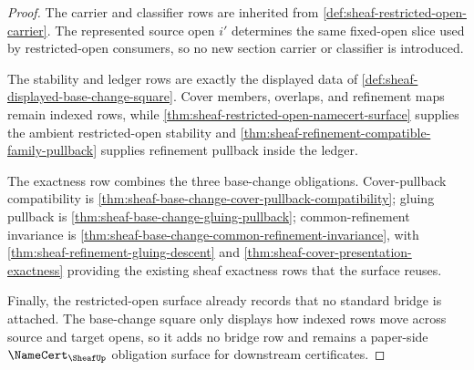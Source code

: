 \begin{proof}
The carrier and classifier rows are inherited from \autoref{def:sheaf-restricted-open-carrier}. The represented source open $i'$ determines the same fixed-open slice used by restricted-open consumers, so no new section carrier or classifier is introduced.

The stability and ledger rows are exactly the displayed data of \autoref{def:sheaf-displayed-base-change-square}. Cover members, overlaps, and refinement maps remain indexed rows, while \autoref{thm:sheaf-restricted-open-namecert-surface} supplies the ambient restricted-open stability and \autoref{thm:sheaf-refinement-compatible-family-pullback} supplies refinement pullback inside the ledger.

The exactness row combines the three base-change obligations. Cover-pullback compatibility is \autoref{thm:sheaf-base-change-cover-pullback-compatibility}; gluing pullback is \autoref{thm:sheaf-base-change-gluing-pullback}; common-refinement invariance is \autoref{thm:sheaf-base-change-common-refinement-invariance}, with \autoref{thm:sheaf-refinement-gluing-descent} and \autoref{thm:sheaf-cover-presentation-exactness} providing the existing sheaf exactness rows that the surface reuses.

Finally, the restricted-open surface already records that no standard bridge is attached. The base-change square only displays how indexed rows move across source and target opens, so it adds no bridge row and remains a paper-side $\NameCert_{\SheafUp}$ obligation surface for downstream certificates.
\end{proof}
